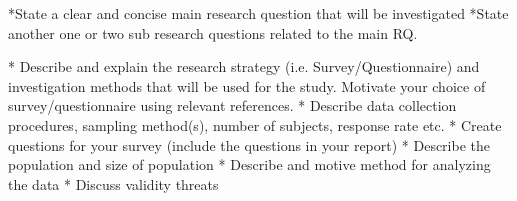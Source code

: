 \documentclass[times, 10pt,twocolumn]{IEEEtran}
\begin{document}
*State a clear and concise main  research  question  that  will  be  investigated
*State another one or  two sub research  questions related to  the main  RQ.



* Describe  and explain the research  strategy (i.e.  Survey/Questionnaire)
and investigation methods that  will  be  used  for the study.  Motivate  your  
choice  of  survey/questionnaire  using relevant  references.
* Describe  data  collection  procedures, sampling  method(s),  number  of  
subjects, response  rate  etc.
* Create  questions for your  survey  (include  the questions in  your  report)
* Describe  the population  and size  of  population
* Describe  and motive  method  for analyzing the data
* Discuss validity  threats





\end{document}
